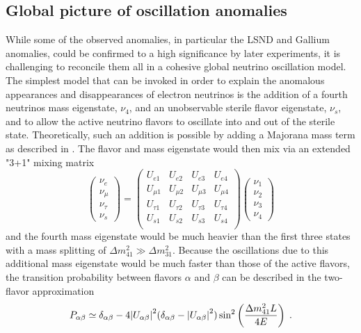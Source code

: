 \subsection{Global picture of oscillation anomalies}
\label{sec:global-anomalies}
While some of the observed anomalies, in particular the LSND and Gallium anomalies, could be confirmed to a high significance by later experiments, it is challenging to reconcile them all in a cohesive global neutrino oscillation model. The simplest model that can be invoked in order to explain the anomalous appearances and disappearances of electron neutrinos is the addition of a fourth neutrinos mass eigenstate, $\nu_4$, and an unobservable sterile flavor eigenstate, $\nu_s$, and to allow the active neutrino flavors to oscillate into and out of the sterile state. Theoretically, such an addition is possible by adding a Majorana mass term as described in . The flavor and mass eigenstate would then mix via an extended "3+1" mixing matrix
\begin{equation}
    \begin{pmatrix}
        \nu_e \\ \nu_\mu \\ \nu_\tau \\ \nu_s
    \end{pmatrix}
    =
    \begin{pmatrix}
    U_{e1}    & U_{e2}    & U_{e3}   &U_{e4}    \\
    U_{\mu1}  & U_{\mu2}  & U_{\mu3} &U_{\mu4}  \\
    U_{\tau1} & U_{\tau2} & U_{\tau3}&U_{\tau4} \\
    U_{s1} & U_{s2} & U_{s3}&U_{s4} \\
    \end{pmatrix}
    \begin{pmatrix}
        \nu_1 \\ \nu_2 \\ \nu_3 \\ \nu_4
    \end{pmatrix}
\end{equation}
and the fourth mass eigenstate would be much heavier than the first three states with a mass splitting of $\Delta m^2_{41} \gg \Delta m^2_{31}$. Because the oscillations due to this additional mass eigenstate would be much faster than those of the active flavors, the transition probability between flavors $\alpha$ and $\beta$ can be described in the two-flavor approximation
\begin{equation}
    P_{\alpha\beta}\simeq \delta_{\alpha\beta} - 4\abs{U_{\alpha\beta}}^2(\delta_{\alpha\beta}-\abs{U_{\alpha\beta}}^2)\sin^2\left(\frac{\Delta m^2_{41}L}{4E}\right)\;.
\end{equation}
